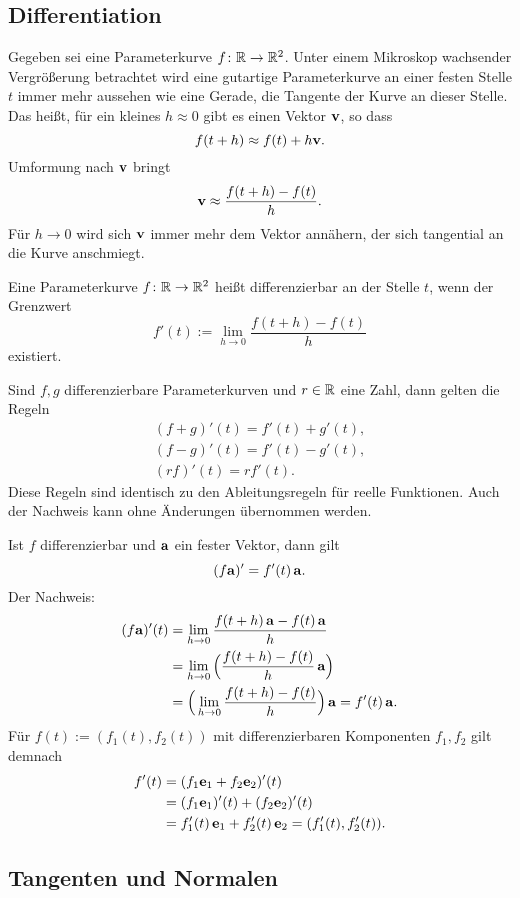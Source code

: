 \subsection{Differentiation}

Gegeben sei eine Parameterkurve $f\colon\mathbb R\to\mathbb R^2$. Unter einem
Mikroskop wachsender Vergrößerung betrachtet wird eine gutartige
Parameterkurve an einer festen Stelle $t$ immer mehr aussehen wie eine
Gerade, die Tangente der Kurve an dieser Stelle. Das heißt, für
ein kleines $h\approx 0$ gibt es einen Vektor $\mathbf{v}$, so dass%
\[f(t+h) \approx f(t)+h\mathbf{v}.\]
Umformung nach $\mathbf{v}$ bringt
\[\mathbf{v} \approx \frac{f(t+h)-f(t)}{h}.\]
Für $h\to 0$ wird sich $\mathbf{v}$ immer mehr dem Vektor annähern,
der sich tangential an die Kurve anschmiegt.

 Eine Parameterkurve $f\colon\mathbb R\to\mathbb R^2$ heißt
differenzierbar an der Stelle $t$, wenn der Grenzwert%
\[f'(t) := \lim_{h\to 0}\frac{f(t+h)-f(t)}{h}\]
existiert.

Sind $f,g$ differenzierbare Parameterkurven und $r\in\mathbb R$ eine Zahl,
dann gelten die Regeln%
\begin{gather*}
(f+g)'(t) = f'(t)+g'(t),\\
(f-g)'(t) = f'(t)-g'(t),\\
(rf)'(t) = rf'(t).
\end{gather*}
Diese Regeln sind identisch zu den Ableitungsregeln für reelle
Funktionen. Auch der Nachweis kann ohne Änderungen übernommen
werden.

Ist $f$ differenzierbar und $\mathbf{a}$ ein fester Vektor, dann gilt%
\[(f\mathbf{a})' = f'(t)\,\mathbf{a}.\]
Der Nachweis:
\begin{align*}
(f\mathbf{a})'(t) &= \lim_{h\to 0}\frac{f(t+h)\,\mathbf{a}-f(t)\,\mathbf{a}}{h}\\
&= \lim_{h\to 0}\Big(\frac{f(t+h)-f(t)}{h}\,\mathbf{a}\Big)\\
&= \Big(\lim_{h\to 0}\frac{f(t+h)-f(t)}{h}\Big)\,\mathbf{a}
= f'(t)\,\mathbf{a}.
\end{align*}
Für $f(t):=(f_1(t),f_2(t))$ mit differenzierbaren Komponenten
$f_1,f_2$ gilt demnach
\begin{align*}
f'(t) &= (f_1\mathbf{e}_1+f_2\mathbf{e}_2)'(t)\\
&= (f_1\mathbf{e}_1)'(t)+(f_2\mathbf{e}_2)'(t)\\
&= f_1'(t)\,\mathbf{e}_1+f_2'(t)\,\mathbf{e}_2 = (f_1'(t),f_2'(t)).
\end{align*}

\subsection{Tangenten und Normalen}

